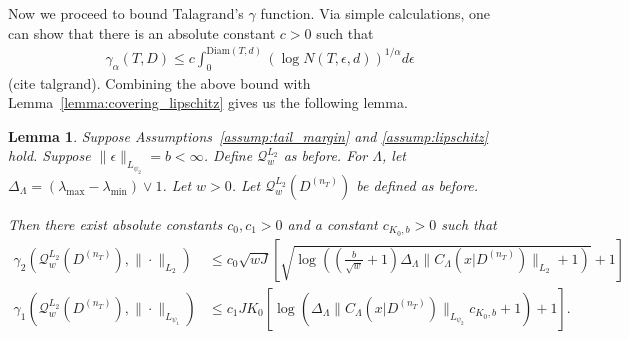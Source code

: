 \documentclass[10pt]{book}
\newtheorem{lemma}{Lemma}
\theoremstyle{definition}
\begin{document}
Now we proceed to bound Talagrand's $\gamma$ function. Via simple calculations, one can show that there is an absolute constant $c > 0$ such that
\begin{align}
\gamma_{\alpha}(T,D)\le c\int_{0}^{\text{Diam}(T,d)}\left(\log N(T,\epsilon,d)\right)^{1/\alpha}d\epsilon
\label{eq:bound_gamma}
\end{align}
(cite talgrand).
Combining the above bound with Lemma~\ref{lemma:covering_lipschitz} gives us the following lemma.

\begin{lemma}
Suppose Assumptions~\ref{assump:tail_margin} and \ref{assump:lipschitz} hold.
Suppose $\|\epsilon\|_{L_{\psi_2}} = b < \infty$.
Define $\mathcal{Q}_w^{L_2}$ as before.
For $\Lambda$, let $\Delta_{\Lambda}=(\lambda_{\max}-\lambda_{\min}) \vee 1$.
Let $w>0$.
Let $\mathcal{Q}_{w}^{L_{2}}(D^{(n_{T})})$ be defined as before.

Then there exist absolute constants $c_0, c_1 >0$ and a constant $c_{K_0, b} > 0$ such that
\begin{align}
\gamma_{2}\left(\mathcal{Q}_{w}^{L_{2}}(D^{(n_{T})}),\|\cdot\|_{L_{2}}\right)
& \le	c_0 \sqrt{w J}
\left[\sqrt{
\log\left(
\left (\frac{b}{\sqrt{w}} + 1 \right )
\Delta_{\Lambda}\|C_\Lambda(x|D^{(n_{T})})\|_{L_{2}} + 1
\right)
}
+1\right]\\
\gamma_{1}\left(\mathcal{Q}_{w}^{L_{2}}(D^{(n_{T})}),\|\cdot\|_{L_{\psi_{1}}}\right)
& \le c_{1}JK_0\left[
\log\left(
	\Delta_{\Lambda}\|C_\Lambda(x|D^{(n_{T})})\|_{L_{\psi_{2}}} c_{K_0, b} +1
\right)
+1\right].
\end{align}
\end{lemma}
\end{document}
